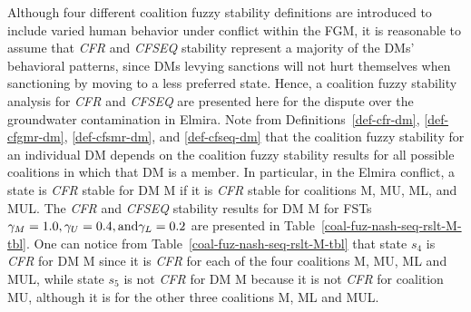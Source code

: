Although four different coalition fuzzy stability definitions are introduced to include varied human behavior under conflict within the FGM, it is reasonable to assume that \emph{CFR} and \emph{CFSEQ} stability represent a majority of the DMs' behavioral patterns, since DMs levying sanctions will not hurt themselves when sanctioning by moving to a less preferred state. Hence, a coalition fuzzy stability analysis for \emph{CFR} and \emph{CFSEQ} are presented here for the dispute over the groundwater contamination in Elmira. Note from Definitions~\ref{def-cfr-dm}, \ref{def-cfgmr-dm}, \ref{def-cfsmr-dm}, and \ref{def-cfseq-dm} that the coalition fuzzy stability for an individual DM depends on the coalition fuzzy stability results for all possible coalitions in which that DM is a member. In particular, in the Elmira conflict, a state is \emph{CFR} stable for DM M if it is \emph{CFR} stable for coalitions M, MU, ML, and MUL. The \emph{CFR} and \emph{CFSEQ} stability results for DM M for FSTs $\gamma_M=1.0, \gamma_U=0.4,{\rm and} \gamma_L=0.2$ are presented in Table~\ref{coal-fuz-nash-seq-rslt-M-tbl}. One can notice from Table~\ref{coal-fuz-nash-seq-rslt-M-tbl} that state $s_4$ is \emph{CFR} for DM M since it is \emph{CFR} for each of the four coalitions M, MU, ML and MUL, while state $s_5$ is not \emph{CFR} for DM M because it is not \emph{CFR} for coalition MU, although it is for the other three coalitions M, ML and MUL.

